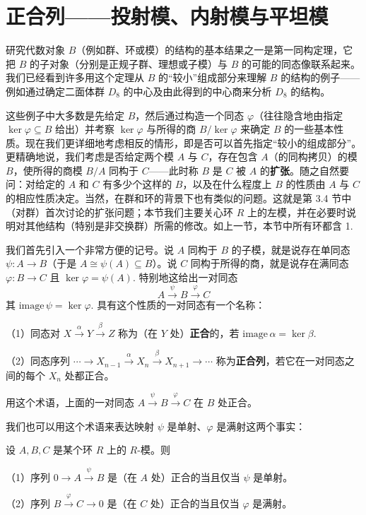 \section{正合列——投射模、内射模与平坦模}

研究代数对象 \(B\)（例如群、环或模）的结构的基本结果之一是第一同构定理，它把 \(B\) 的子对象（分别是正规子群、理想或子模）与 \(B\) 的可能的同态像联系起来。我们已经看到许多用这个定理从 \(B\) 的“较小”组成部分来理解 \(B\) 的结构的例子——例如通过确定二面体群 \(D_8\) 的中心及由此得到的中心商来分析 \(D_8\) 的结构。

这些例子中大多数是先给定 \(B\)，然后通过构造一个同态 \(\varphi\)（往往隐含地由指定 \(\ker\varphi \subseteq B\) 给出）并考察 \(\ker\varphi\) 与所得的商 \(B/\ker\varphi\) 来确定 \(B\) 的一些基本性质。现在我们更详细地考虑相反的情形，即是否可以首先指定“较小的组成部分”。更精确地说，我们考虑是否给定两个模 \(A\) 与 \(C\)，存在包含 \(A\)（的同构拷贝）的模 \(B\)，使所得的商模 \(B/A\) 同构于 \(C\)——此时称 \(B\) 是 \(C\) 被 \(A\) 的\textbf{扩张}。随之自然要问：对给定的 \(A\) 和 \(C\) 有多少个这样的 \(B\)，以及在什么程度上 \(B\) 的性质由 \(A\) 与 \(C\) 的相应性质决定。当然，在群和环的背景下也有类似的问题。这就是第 3.4 节中（对群）首次讨论的扩张问题；本节我们主要关心环 \(R\) 上的左模，并在必要时说明对其他结构（特别是非交换群）所需的修改。如上一节，本节中所有环都含 1.

我们首先引入一个非常方便的记号。说 \(A\) 同构于 \(B\) 的子模，就是说存在单同态 \(\psi : A \to B\)（于是 \(A \cong \psi(A) \subseteq B\)）。说 \(C\) 同构于所得的商，就是说存在满同态 \(\varphi : B \to C\) 且 \(\ker\varphi = \psi(A)\). 特别地这给出一对同态
\[
A \xrightarrow{\ \psi\ } B \xrightarrow{\ \varphi\ } C
\]
其 \(\mathrm{image}\,\psi = \ker\varphi\). 具有这个性质的一对同态有一个名称：

\begin{definition}
（1）同态对 \(X \xrightarrow{\alpha} Y \xrightarrow{\beta} Z\) 称为（在 \(Y\) 处）\textbf{正合}的，若 \(\mathrm{image}\,\alpha = \ker\beta\).

（2）同态序列 \(\cdots \to X_{n-1} \xrightarrow{\alpha} X_n \xrightarrow{\beta} X_{n+1} \to \cdots\) 称为\textbf{正合列}，若它在一对同态之间的每个 \(X_n\) 处都正合。
\end{definition}

用这个术语，上面的一对同态 \(A \xrightarrow{\psi} B \xrightarrow{\varphi} C\) 在 \(B\) 处正合。

我们也可以用这个术语来表达映射 \(\psi\) 是单射、\(\varphi\) 是满射这两个事实：

\begin{proposition}\label{pro:10.22}
设 \(A, B, C\) 是某个环 \(R\) 上的 \(R\)-模。则

（1）序列 \(0 \to A \xrightarrow{\psi} B\) 是（在 \(A\) 处）正合的当且仅当 \(\psi\) 是单射。

（2）序列 \(B \xrightarrow{\varphi} C \to 0\) 是（在 \(C\) 处）正合的当且仅当 \(\varphi\) 是满射。
\end{proposition}


